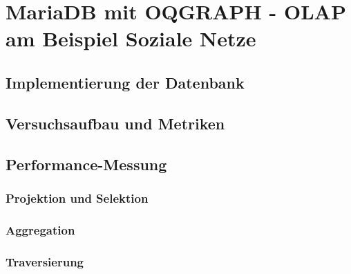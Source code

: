 \chapter{MariaDB mit OQGRAPH - OLAP am Beispiel Soziale Netze}
\section{Implementierung der Datenbank}
\section{Versuchsaufbau und Metriken}
\section{Performance-Messung}
\subsection{Projektion und Selektion}
\subsection{Aggregation}
\subsection{Traversierung}